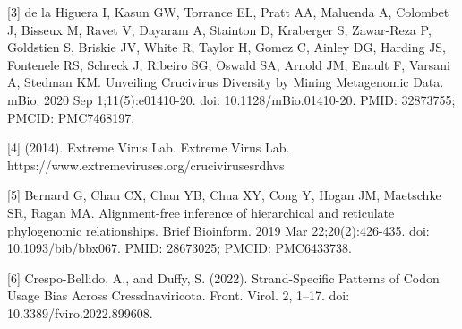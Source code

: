 \documentclass[eng]{ajceam-class}
\begin{document}
[3] de la Higuera I, Kasun GW, Torrance EL, Pratt AA, Maluenda A, Colombet J, Bisseux M, Ravet V, Dayaram A, Stainton D, Kraberger S, Zawar-Reza P, Goldstien S, Briskie JV, White R, Taylor H, Gomez C, Ainley DG, Harding JS, Fontenele RS, Schreck J, Ribeiro SG, Oswald SA, Arnold JM, Enault F, Varsani A, Stedman KM. Unveiling Crucivirus Diversity by Mining Metagenomic Data. mBio. 2020 Sep 1;11(5):e01410-20. doi: 10.1128/mBio.01410-20. PMID: 32873755; PMCID: PMC7468197.

[4] (2014). Extreme Virus Lab. Extreme Virus Lab. https://www.extremeviruses.org/crucivirusesrdhvs

[5] Bernard G, Chan CX, Chan YB, Chua XY, Cong Y, Hogan JM, Maetschke SR, Ragan MA. Alignment-free inference of hierarchical and reticulate phylogenomic relationships. Brief Bioinform. 2019 Mar 22;20(2):426-435. doi: 10.1093/bib/bbx067. PMID: 28673025; PMCID: PMC6433738.

[6] Crespo-Bellido, A., and Duffy, S. (2022). Strand-Specific Patterns of Codon Usage Bias Across Cressdnaviricota. Front. Virol. 2, 1–17. doi: 10.3389/fviro.2022.899608.
‌
\end{document}
